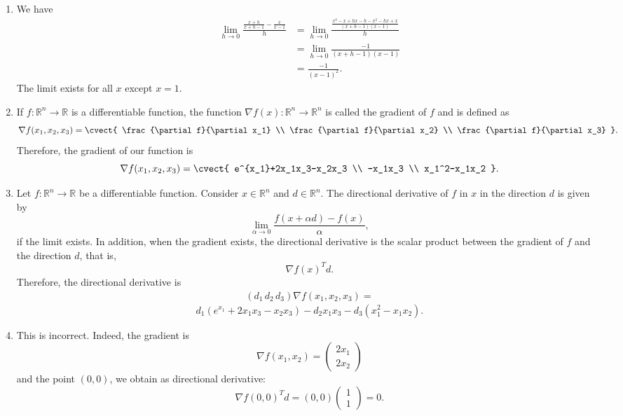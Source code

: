 \begin{enumerate}

\item  We have
  \begin{align*}
\lim_{h\to 0} \frac{\frac{x+h}{x+h-1}-\frac{x}{x-1}}{h}&= \lim_{h\to
  0} \frac{\frac{x^2-x+hx-h-x^2-hx+x}{(x+h-1)(x-1)}}{h} \\&=
\lim_{h\to 0} \frac{-1}{(x+h-1)(x-1)} \\&= \frac{-1}{(x-1)^2}.	
  \end{align*}
The limit exists for all $x$ except $x=1$.


\item If $f: \mathbb{R}^n \rightarrow \mathbb{R}$ is a differentiable
function, the function $\nabla f(x): \mathbb{R}^n \rightarrow \mathbb{R}^n$ is called the gradient of $f$ and is defined as 
\[
  \nabla f(x_1,x_2,x_3)
=
\cvect{
     \frac{\partial f}{\partial x_1} \\
    \frac{\partial f}{\partial x_2}  \\
    \frac{\partial f}{\partial x_3} 
}.
\]
Therefore, the gradient of our function is
\[
 \nabla f(x_1,x_2,x_3)
=
\cvect{
     e^{x_1}+2x_1x_3-x_2x_3 \\
    -x_1x_3 \\
    x_1^2-x_1x_2
}.
\]

\item  Let $f: \mathbb{R}^n \rightarrow \mathbb{R}$ be a differentiable
 function. Consider $x \in \mathbb{R}^n$ and $d \in \mathbb{R}^n$. The
 directional derivative of $f$ in $x$ in the direction $d$ is given by
 \[
\lim_{\alpha\to 0} \frac{f(x+ \alpha d)-f(x)}{\alpha}, 
\]
if the limit exists. In addition, when the gradient exists, the
directional derivative is the scalar product between the gradient of
$f$ and the direction $d$, that is,
\[
\nabla f(x)^Td.
\]
Therefore, the directional derivative is
\begin{align*}
(d_1 \, d_2 \,d_3)\nabla f(x_1,x_2,x_3)=
\end{align*}
\[d_1(e^{x_1}+2x_1x_3-x_2x_3)-d_2x_1x_3-d_3(x_1^2-x_1x_2). \]

\item This is incorrect. Indeed, the gradient is
$$\nabla f(x_1,x_2)= 
\begin{pmatrix}
2x_1\\
2x_2
\end{pmatrix}
$$ 
and the point $(0,0)$, we obtain as directional derivative:
$$\text{$\nabla$}f(0,0)^Td=(0,0)\begin{pmatrix}
1\\1
\end{pmatrix}=0.$$



\end{enumerate}
